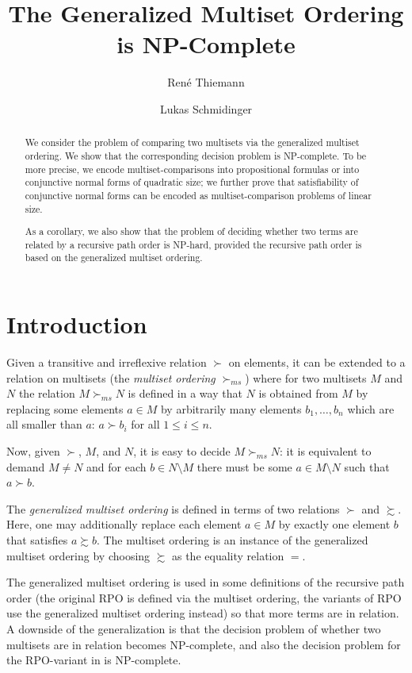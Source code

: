 \documentclass[11pt,a4paper]{article}
\newcommand\sms{\mathrel{\succ_{\mathit{ms}}}}
\begin{document}
\title{The Generalized Multiset Ordering is NP-Complete}
\author{Ren\'e Thiemann \and Lukas Schmidinger}
\maketitle

\begin{abstract}
We consider the problem of comparing two multisets via the
generalized multiset ordering. We show that the corresponding decision problem
is NP-complete. To be more precise, we encode
multiset-comparisons into propositional formulas or into conjunctive normal forms 
of quadratic size;
we further prove that satisfiability of conjunctive normal forms can be encoded as
multiset-comparison problems of linear size. 

As a corollary, we also show that the problem of deciding whether
two terms are related by a recursive path order is NP-hard,
provided the recursive path order is based on the generalized multiset ordering.
\end{abstract}

\tableofcontents

\section{Introduction}

Given a transitive and irreflexive relation $\succ$ on elements, 
it can be extended to a relation on multisets (the \emph{multiset ordering} $\sms$)
where for two multisets $M$ and $N$ the relation $M \sms N$ is defined in a way that $N$ is obtained from $M$ by
replacing some elements $a \in M$ by arbitrarily many elements $b_1,\dots,b_n$  which are
all smaller than $a$: $a \succ b_i$ for all $1 \leq i \leq n$.

Now, given $\succ$, $M$, and $N$, it is easy to decide $M \sms N$: it is equivalent
to demand $M \neq N$ and for each $b \in N \setminus M$ there must be some $a \in M \setminus N$ 
such that $a \succ b$.

The \emph{generalized multiset ordering} is defined in terms of two 
relations $\succ$ and $\succsim$. Here, one may additionally replace each element $a \in M$ by exactly one
element $b$ that satisfies $a \succsim b$. 
The multiset ordering is an instance of the generalized multiset ordering by choosing ${\succsim}$ as the
equality relation ${=}$.

The generalized multiset ordering is used in some definitions of  
the recursive path order (the original RPO \cite{RPO} is defined via the multiset ordering, the variants of RPO \cite{RPO_NP,RPO_NPC} use the generalized multiset ordering instead)  
so that more terms are in relation. A downside of the generalization is that the decision problem of whether
two multisets are in relation becomes NP-complete, and also the decision
problem for the RPO-variant in \cite{RPO_NPC} is NP-complete.
\end{document}
